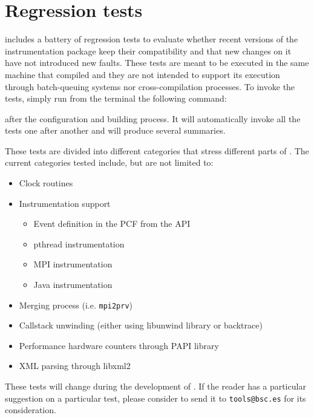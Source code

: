 \chapter{Regression tests}\label{cha:RegressionTests}

\TRACE includes a battery of regression tests to evaluate whether recent versions of the instrumentation package keep their compatibility and that new changes on it have not introduced new faults.
These tests are meant to be executed in the same machine that compiled \TRACE and they are not intended to support its execution through batch-queuing systems nor cross-compilation processes.
To invoke the tests, simply run from the terminal the following command:


after the configuration and building process. It will automatically invoke all the tests one after another and will produce several summaries.

These tests are divided into different categories that stress different parts of \TRACE.
The current categories tested include, but are not limited to:
\begin{itemize}
\item Clock routines
\item Instrumentation support
\begin{itemize}
  \item Event definition in the PCF from the \TRACE API
  \item pthread instrumentation
  \item MPI instrumentation
  \item Java instrumentation
\end{itemize}
\item Merging process (i.e. \texttt{mpi2prv})
\item Callstack unwinding (either using libunwind library or backtrace)
\item Performance hardware counters through PAPI library
\item XML parsing through libxml2
\end{itemize}

These tests will change during the development of \TRACE.
If the reader has a particular suggestion on a particular test, please consider to send it to \texttt{tools@bsc.es} for its consideration.

